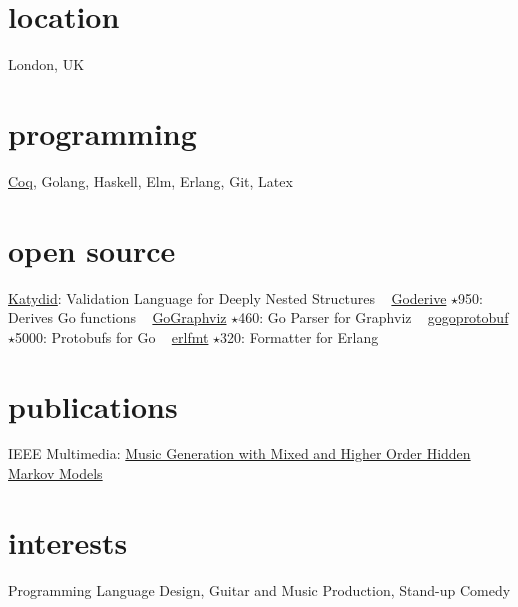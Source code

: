 \documentclass[print]{friggeri-cv-a4} %
\begin{document}

\begin{aside} %
\section{location}
London, UK
\section{programming}
\href{https://coq.inria.fr/}{Coq}, Golang, Haskell, Elm, Erlang, Git, Latex
\section{open source}
\href{https://github.com/katydid/katydid}{Katydid}: Validation Language for Deeply Nested Structures
~
\href{https://github.com/awalterschulze/goderive}{Goderive} $\star$950: Derives Go functions
~
\href{https://github.com/awalterschulze/gographviz}{GoGraphviz} $\star$460: Go Parser for Graphviz
~
\href{https://github.com/gogo/protobuf}{gogoprotobuf} $\star$5000: Protobufs for Go 
~
\href{https://github.com/WhatsApp/erlfmt}{erlfmt} $\star$320: Formatter for Erlang
\section{publications}
IEEE Multimedia: \href{http://doi.ieeecomputersociety.org/10.1109/MMUL.2010.44}{Music Generation with Mixed and Higher Order Hidden Markov Models}
\section{interests}
Programming Language Design, Guitar and Music Production, Stand-up Comedy
\end{aside}
\end{document}
